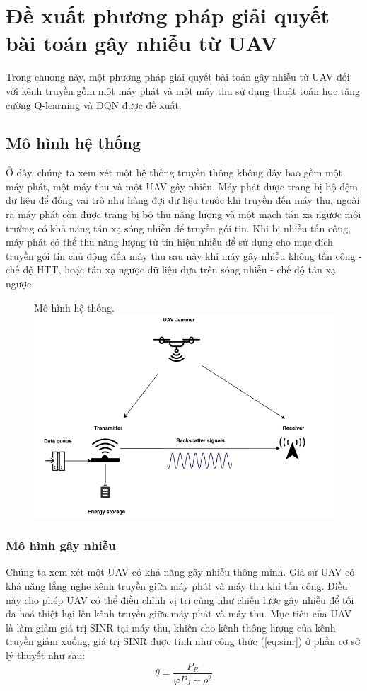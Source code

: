 \documentclass{uetgraduation}
\begin{document}
\chapter{Đề xuất phương pháp giải quyết bài toán gây nhiễu từ UAV}
Trong chương này, một phương pháp giải quyết bài toán gây nhiễu từ UAV đối với kênh truyền gồm một máy phát và một máy thu sử dụng thuật toán học tăng cường Q-learning và DQN được đề xuất.

\section{Mô hình hệ thống}
Ở đây, chúng ta xem xét một hệ thống truyền thông không dây bao gồm một máy phát, một máy thu và một UAV gây nhiễu. Máy phát được trang bị bộ đệm dữ liệu để đóng vai trò như hàng đợi dữ 
liệu trước khi truyền đến máy thu, ngoài ra máy phát còn được trang bị bộ thu năng lượng và một mạch tán xạ ngược môi trường có khả năng tán xạ sóng nhiễu để truyền gói tin. Khi bị nhiễu
tấn công, máy phát có thể thu năng lượng từ tín hiệu nhiễu để sử dụng cho mục đích truyền gói tin chủ
động đến máy thu sau này khi máy gây nhiễu không tấn công - chế độ HTT, hoặc tán xạ ngược dữ liệu dựa trên sóng nhiễu - chế độ tán xạ ngược.

\begin{figure}{Mô hình hệ thống.}
    \centering
    \includegraphics[scale=0.5]{system_model}
    \label{fig:system_model}
\end{figure}

\subsection{Mô hình gây nhiễu}
Chúng ta xem xét một UAV có khả năng gây nhiễu thông minh. Giả sử UAV có khả năng lắng nghe kênh truyền giữa máy phát và máy thu khi tấn công. Điều này cho phép UAV có thể điều chỉnh vị trí
cũng như chiến lược gây nhiễu để tối đa hoá thiệt hại lên kênh truyền giữa máy phát và máy thu. Mục tiêu của UAV là làm giảm giá trị SINR tại máy thu, khiến cho kênh thông lượng của kênh
truyền giảm xuống, giá trị SINR được tính như công thức (\ref{eq:sinr}) ở phần cơ sở lý thuyết như sau:
\begin{equation}
    \theta = \frac{P_R}{\varphi P_J + \rho^2}
\end{equation}
\end{document}

